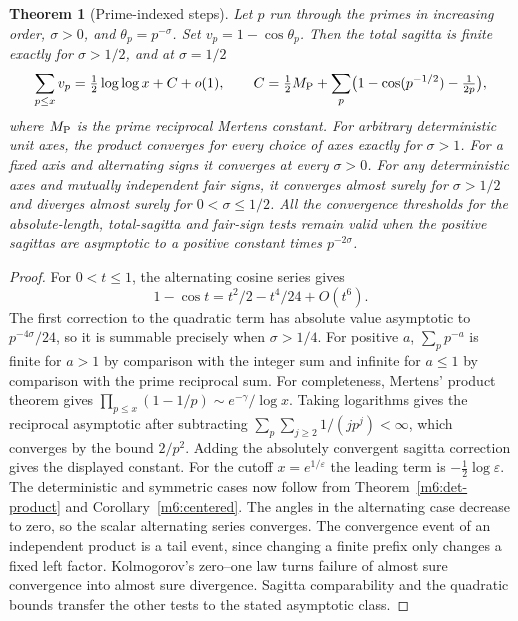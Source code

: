 \documentclass[11pt,reqno]{amsart}
\newtheorem{theorem}{Theorem}[section]
\theoremstyle{definition}
\theoremstyle{remark}
\numberwithin{equation}{section}
\begin{document}
\begin{theorem}[Prime-indexed steps]\label{m6:prime-products}
Let \(p\) run through the primes in increasing order,
\(\sigma>0\), and \(\theta_p=p^{-\sigma}\). Set
\(v_p=1-\cos\theta_p\). Then the total sagitta is finite exactly
for \(\sigma>1/2\), and at \(\sigma=1/2\)
\[
 \sum_{p\le x}v_p=\tfrac12\log\log x+C+o(1),\qquad
 C=\tfrac12 M_{\rm P}+
      \sum_p\bigl(1-\cos(p^{-1/2})-\tfrac1{2p}\bigr),
\]
where \(M_{\rm P}\) is the prime reciprocal Mertens constant.
For arbitrary deterministic unit axes, the product converges for
every choice of axes exactly for \(\sigma>1\). For a fixed axis
and alternating signs it converges at every \(\sigma>0\).
For any deterministic axes and mutually independent fair signs,
it converges almost surely for \(\sigma>1/2\) and diverges almost
surely for \(0<\sigma\le1/2\). All
the convergence thresholds for the absolute-length, total-sagitta
and fair-sign tests remain valid when the positive sagittas are
asymptotic to a positive constant times \(p^{-2\sigma}\).
\end{theorem}
\begin{proof}
For \(0<t\le1\), the alternating cosine series gives
\[
 1-\cos t=t^2/2-t^4/24+O(t^6).
\]
The first correction to the quadratic term has absolute value
asymptotic to \(p^{-4\sigma}/24\), so it is summable precisely
when \(\sigma>1/4\). For positive \(a\), \(\sum_p p^{-a}\) is finite
for \(a>1\) by comparison with the integer sum and infinite for
\(a\le1\) by comparison with the prime reciprocal sum.
For completeness, Mertens' product theorem
\cite{m6:Mertens} gives
\(\prod_{p\le x}(1-1/p)\sim e^{-\gamma}/\log x\).
Taking logarithms gives the reciprocal asymptotic after subtracting
\(\sum_p\sum_{j\ge2}1/(jp^j)<\infty\), which converges by the bound
\(2/p^2\). Adding the absolutely convergent sagitta correction
gives the displayed constant. For the cutoff \(x=e^{1/\varepsilon}\)
the leading term is \(-\frac12\log\varepsilon\).
The deterministic and symmetric cases now follow from
Theorem~\ref{m6:det-product} and Corollary~\ref{m6:centered}.
The angles in the alternating case decrease to zero, so the
scalar alternating series converges. The convergence event of an
independent product is a tail event, since changing a finite prefix
only changes a fixed left factor. Kolmogorov's zero--one law turns
failure of almost sure convergence into almost sure divergence.
Sagitta comparability and
the quadratic bounds transfer the other tests to the stated
asymptotic class.
\end{proof}
\end{document}
